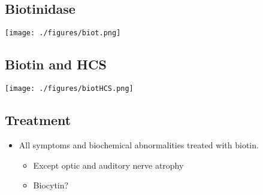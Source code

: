 \documentclass[presentation, smaller]{beamer}
\begin{document}
\subsection{Biotinidase}
\label{sec:orgheadline6}

\texttt{[image: ./figures/biot.png]}

\subsection{Biotin and HCS}
\label{sec:orgheadline7}

\texttt{[image: ./figures/biotHCS.png]}


\subsection{Treatment}
\label{sec:orgheadline8}
\begin{itemize}
\item All symptoms and biochemical abnormalities treated with biotin.
\begin{itemize}
\item Except optic and auditory nerve atrophy
\item Biocytin?
\end{itemize}
\end{itemize}
\end{document}
